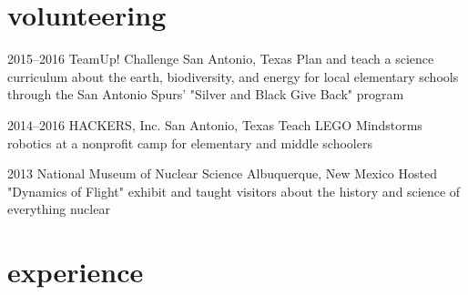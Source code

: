 \documentclass[print]{friggeri-cv} %
\begin{document}

\section{volunteering}

\begin{entrylist}
	
	\entry
	{2015--2016}
	{TeamUp! Challenge}
	{San Antonio, Texas}
	{Plan and teach a science curriculum about the earth, biodiversity, and energy for local elementary schools through the San Antonio Spurs' "Silver and Black Give Back" program}
	
	
	\entry
	{2014--2016}
	{HACKERS, Inc.}
	{San Antonio, Texas}
	{Teach LEGO Mindstorms robotics at a nonprofit camp for elementary and middle schoolers}
	

	\entry
	{2013}
	{National Museum of Nuclear Science}
	{Albuquerque, New Mexico}
	{Hosted "Dynamics of Flight" exhibit and taught visitors about the history and science of everything nuclear}
	
\end{entrylist}


\section{experience}

\end{document}
